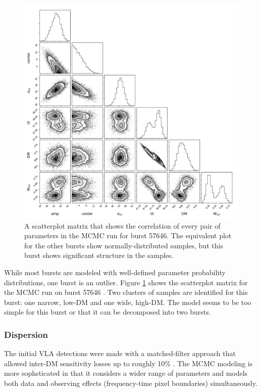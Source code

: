 \documentclass[twocolumn]{aastex61}
\begin{document}
\begin{figure}[htb]
\begin{center}
\includegraphics[width=2\columnwidth]{corner57646}
\caption{A scatterplot matrix that shows the correlation of every pair of parameters in the MCMC run for burst 57646. The equivalent plot for the other bursts show normally-distributed samples, but this burst shows significant structure in the samples.
\label{fig:corner}}
\end{center}
\end{figure}

While most bursts are modeled with well-defined parameter probability distributions, one burst is an outlier. Figure \ref{fig:corner} shows the scatterplot matrix for the MCMC run on burst 57646 \citep{corner}. Two clusters of samples are identified for this burst: one narrow, low-DM and one wide, high-DM. The model seems to be too simple for this burst or that it can be decomposed into two bursts.

\subsubsection{Dispersion}

The initial VLA detections were made with a matched-filter approach that allowed inter-DM sensitivity losses up to roughly 10\% \citep[$\Delta \rm{DM}=10\ \rm{pc}\ \rm{cm}^{-3}$][]{2003ApJ...596.1142C}. 
The MCMC modeling is more sophsticated in that it considers a wider range of parameters and models both data and observing effects (frequency-time pixel boundaries) simultaneously.
\end{document}
